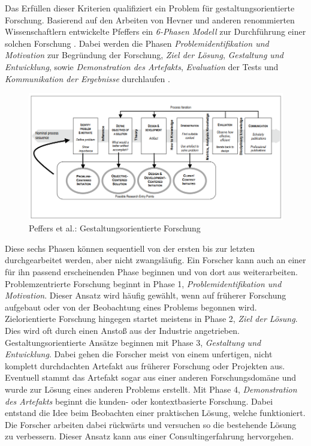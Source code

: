 Das Erfüllen dieser Kriterien qualifiziert ein Problem für gestaltungsorientierte Forschung. Basierend auf den Arbeiten von Hevner und anderen renommierten Wissenschaftlern entwickelte Pfeffers ein \textit{6-Phasen Modell} zur Durchführung einer solchen Forschung \cite{j._ellis_guide_2010}. Dabei werden die Phasen \textit{Problemidentifikation und Motivation} zur Begründung der Forschung, \textit{Ziel der Lösung}, \textit{Gestaltung und Entwicklung}, sowie \textit{Demonstration des Artefakts}, \textit{Evaluation} der Tests und \textit{Kommunikation der Ergebnisse} durchlaufen \cite{peffers_design_2007}. 

\begin{figure}[h]
	\begin{center}
		\noindent\includegraphics[width=\linewidth,height=\textheight,keepaspectratio]{Resources/DS_Peffers.png}
		\caption{Peffers et al.: Gestaltungsorientierte Forschung \cite{peffers_design_2007}}
	\end{center}
\end{figure}

Diese sechs Phasen können sequentiell von der ersten bis zur letzten durchgearbeitet werden, aber nicht zwangsläufig. Ein Forscher kann auch an einer für ihn passend erscheinenden Phase beginnen und von dort aus weiterarbeiten. Problemzentrierte Forschung beginnt in Phase 1, \textit{Problemidentifikation und Motivation}. Dieser Ansatz wird häufig gewählt, wenn auf früherer Forschung aufgebaut oder von der Beobachtung eines Problems begonnen wird. Zielorientierte Forschung hingegen startet meistens in Phase 2, \textit{Ziel der Lösung}. Dies wird oft durch einen Anstoß aus der Industrie angetrieben. Gestaltungsorientierte Ansätze beginnen mit Phase 3, \textit{Gestaltung und Entwicklung}. Dabei gehen die Forscher meist von einem unfertigen, nicht komplett durchdachten Artefakt aus früherer Forschung oder Projekten aus. Eventuell stammt das Artefakt sogar aus einer anderen Forschungsdomäne und wurde zur Lösung eines anderen Problems erstellt. Mit Phase 4, \textit{Demonstration des Artefakts} beginnt die kunden- oder kontextbasierte Forschung. Dabei entstand die Idee beim Beobachten einer praktischen Lösung, welche funktioniert. Die Forscher arbeiten dabei rückwärts und versuchen so die bestehende Lösung zu verbessern. Dieser Ansatz kann aus einer Consultingerfahrung hervorgehen.

